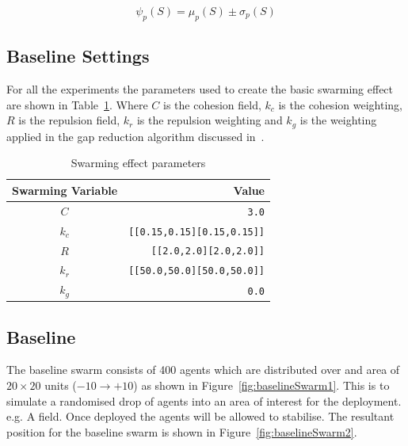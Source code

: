 \documentclass[12pt,a4paper]{IEEEtran}
\newcommand{\kc}{\mathit{k_{c}}}
\newcommand{\kr}{\mathit{k_{r}}}
\newcommand{\kg}{\mathit{k_{g}}}
\newcommand{\rb}{\mathit{R}}
\begin{document}
\small
\begin{equation}
\label{eq:SwarmMagnitudeMatric}
\psi_p(S) = \mu_p(S)\pm \sigma_p(S)
\end{equation}
\normalsize

\subsection{Baseline Settings}
For all the experiments the parameters used to create the basic swarming effect are shown in Table~\ref{tab:swarmingEffect}. Where $C$ is the cohesion field, $\kc$ is the cohesion weighting, $\rb$ is the repulsion field, $\kr$ is the repulsion weighting and $\kg$ is the weighting applied in the gap reduction algorithm discussed in~\cite{eliot2019void}. 

\begin{table}[H]
	\centering
	\tiny
	\begin{tabular}{|c|r|}
		\hline
		\rowcolor[HTML]{000000} 
		{\color[HTML]{FFFFFF} Swarming Variable} & {\color[HTML]{FFFFFF} Value} \\ \hline
		$C$ & \texttt{3.0} \\ \hline
		$k_c$ & \texttt{[[0.15,0.15][0.15,0.15]]}  \\ \hline
		$R$ & \texttt{[[2.0,2.0][2.0,2.0]]} \\ \hline
		$k_r$ & \texttt{[[50.0,50.0][50.0,50.0]]} \\ \hline
		$k_g$ & \texttt{0.0} \\ \hline
	\end{tabular}
	\caption{Swarming effect parameters}
	\label{tab:swarmingEffect}
\end{table}

\subsection{Baseline}
The baseline swarm consists of 400 agents which are distributed over and area of $20\times 20$ units ($-10\rightarrow+10$) as shown in Figure~\ref{fig:baselineSwarm1}. This is to simulate a randomised drop of agents into an area of interest for the deployment. e.g. A field. Once deployed the agents will be allowed to stabilise. The resultant position for the baseline swarm is shown in Figure~\ref{fig:baselineSwarm2}. 
\end{document}
